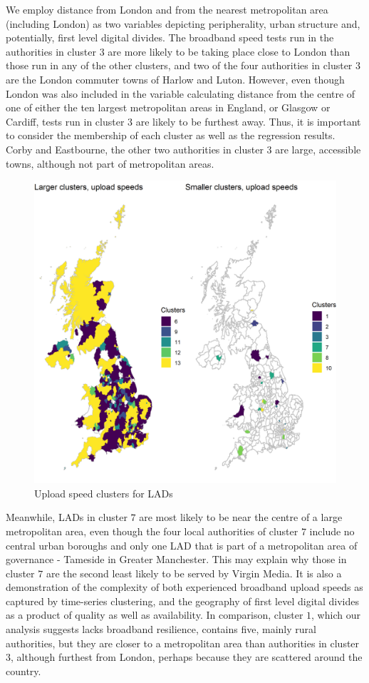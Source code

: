 \documentclass[Royal,times,sageh]{sagej}
\begin{document}
We employ distance from London and from the nearest metropolitan area
(including London) as two variables depicting peripherality, urban
structure and, potentially, first level digital divides. The broadband
speed tests run in the authorities in cluster \(3\) are more likely to
be taking place close to London than those run in any of the other
clusters, and two of the four authorities in cluster \(3\) are the
London commuter towns of Harlow and Luton. However, even though London
was also included in the variable calculating distance from the centre
of one of either the ten largest metropolitan areas in England, or
Glasgow or Cardiff, tests run in cluster \(3\) are likely to be furthest
away. Thus, it is important to consider the membership of each cluster
as well as the regression results. Corby and Eastbourne, the other two
authorities in cluster \(3\) are large, accessible towns, although not
part of metropolitan areas.

\begin{figure}
\includegraphics[width=0.95\linewidth]{figures/map.up.clusters} \caption{\label{map.up.clusters}Upload speed clusters for LADs}\label{fig:unnamed-chunk-6}
\end{figure}

Meanwhile, LADs in cluster \(7\) are most likely to be near the centre
of a large metropolitan area, even though the four local authorities of
cluster \(7\) include no central urban boroughs and only one LAD that is
part of a metropolitan area of governance - Tameside in Greater
Manchester. This may explain why those in cluster \(7\) are the second
least likely to be served by Virgin Media. It is also a demonstration of
the complexity of both experienced broadband upload speeds as captured
by time-series clustering, and the geography of first level digital
divides as a product of quality as well as availability. In comparison,
cluster \(1\), which our analysis suggests lacks broadband resilience,
contains five, mainly rural authorities, but they are closer to a
metropolitan area than authorities in cluster \(3\), although furthest
from London, perhaps because they are scattered around the country.
\end{document}
